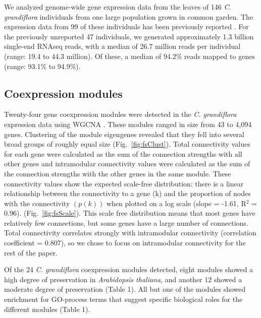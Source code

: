 We analyzed genome-wide gene expression data from the leaves of 146 \textit{C. grandiflora} individuals from one large population grown in common garden. The expression data from 99 of these individuals has been previously reported \citep{Josephs2015-nx}. For the previously unreported 47 individuals, we generated approximately 1.3 billion single-end RNAseq reads, with a median of 26.7 million reads per individual (range: 19.4 to 44.3 million). Of these, a median of 94.2\% reads mapped to genes (range: 93.1\% to 94.9\%).

\subsection{Coexpression modules}
Twenty-four gene coexpression modules were detected in the \textit{C. grandiflora} expression data using WGCNA \citep{langfelder2008}. These modules ranged in size from 43 to 4,094 genes. Clustering of the module eigengenes revealed that they fell into several broad groups of roughly equal size (Fig.~\ref{fig:fsClust}). Total connectivity values for each gene were calculated as the sum of the connection strengths with all other genes and intramodular connectivity values were calculated as the sum of the connection strengths with the other genes in the same module. These connectivity values show the expected scale-free distribution: there is a linear relationship between the connectivity to a gene (k) and the proportion of nodes with the connectivity $(p(k))$ when plotted on a log scale (slope = -1.61, R$^{2}$ = 0.96). (Fig.~\ref{fig:fsScale}). This scale free distribution means that most genes have relatively few connections, but some genes have a large number of connections. Total connectivity correlates strongly with intramodular connectivity (correlation coefficient = 0.807), so we chose to focus on intramodular connectivity for the rest of the paper.

Of the 24 \textit{C. grandiflora} coexpression modules detected, eight modules showed a high degree of preservation in \textit{Arabidopsis thaliana}, and another 12 showed a moderate degree of preservation (Table 1). All but one of the modules showed enrichment for GO-process terms that suggest specific biological roles for the different modules (Table 1).

